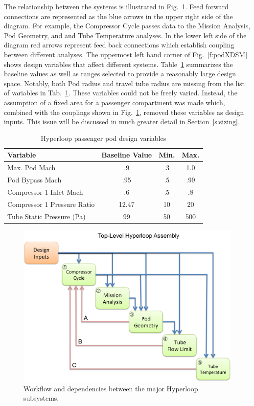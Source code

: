 \documentclass[heading.tex]{subfiles}
\begin{document}
The relationship between the systems is illustrated in Fig.~\ref{f:hyperloopXDSM}. Feed forward connections 
are represented as the blue arrows in the upper right side of the diagram. For example, the Compressor Cycle 
passes data to the Mission Analysis, Pod Geometry, and and Tube Temperature analyses. In the lower left 
side of the diagram red arrows represent feed back connections which establish coupling between different 
analyses. The uppermost left hand corner of Fig.~\ref{f:podXDSM} shows design variables that affect 
different systems. Table~\ref{tab:desvars} summarizes the baseline values as well as ranges selected 
to provide a reasonably large design space. Notably, both Pod radius and travel tube radius are missing 
from the list of variables in Tab.~\ref{tab:desvars}. These variables could not be freely varied. Instead, the assumption of a fixed area for a passenger compartment was made which, combined with the couplings shown in Fig.~\ref{f:hyperloopXDSM}, removed these variables as design inputs. This issue will be discussed in much greater detail in Section~\ref{s:sizing}.

\begin{table}
    \centering
    \caption{Hyperloop passenger pod design variables}
    \label{tab:desvars}
    \begin{tabular}{l  c  c  c} 
        \hline
        Variable & Baseline Value & Min. & Max. \\ \hline 
        Max. Pod Mach & .9 & .3 & 1.0 \\ 
        Pod Bypass Mach & .95 & .5 & .99 \\
        Compressor 1 Inlet Mach & .6 & .5 & .8 \\ 
        Compressor 1 Pressure Ratio & 12.47 & 10 & 20 \\ 
        Tube Static Pressure (Pa) & 99 & 50 & 500 \\ \hline
    \end{tabular}
\end{table}

\begin{figure}[hbtp]
\centering
\includegraphics[width=\textwidth]{images/TopAssembly.png}
\caption{Workflow and dependencies between the major Hyperloop subsystems.}
\label{f:hyperloopXDSM}
\end{figure}
\end{document}
